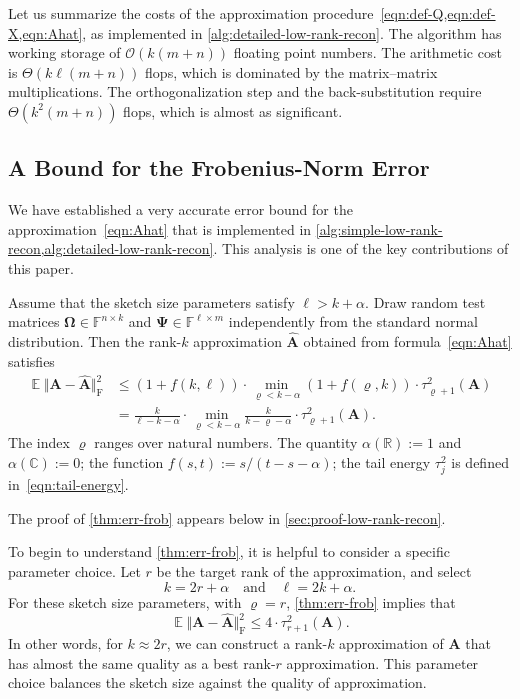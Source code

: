 \documentclass[final]{siamart1116}
\numberwithin{equation}{section}
\numberwithin{theorem}{section}
\numberwithin{figure}{section}
\newcommand{\R}{\mathbb{R}}
\newcommand{\C}{\mathbb{C}}
\newcommand{\F}{\mathbb{F}}
\newcommand{\mtx}[1]{\bm{#1}}
\newcommand{\norm}[1]{\Vert #1 \Vert}
\newcommand{\fnorm}[1]{\norm{#1}_{\mathrm{F}}}
\newcommand{\fnormsq}[1]{\fnorm{#1}^2}
\newcommand{\Expect}{\operatorname{\mathbb{E}}}
\begin{document}
Let us summarize the costs of the
approximation procedure~\cref{eqn:def-Q,eqn:def-X,eqn:Ahat},
as implemented in \cref{alg:detailed-low-rank-recon}.
The algorithm has working storage of $\mathcal{O}(k(m + n))$ floating point numbers.
The arithmetic cost is $\Theta(k\ell (m + n))$ flops, which is dominated
by the matrix--matrix multiplications. The orthogonalization step and the back-substitution require $\Theta(k^2 (m+n))$ flops, which is almost as significant.






\subsection{A Bound for the Frobenius-Norm Error} 
We have established a very accurate error bound for the
approximation~\cref{eqn:Ahat}
that is implemented in \cref{alg:simple-low-rank-recon,alg:detailed-low-rank-recon}.
This analysis is one of the key contributions of this paper.



\begin{theorem} \label{thm:err-frob}
Assume that the sketch size parameters satisfy $\ell > k + \alpha$.
Draw random test matrices $\mtx{\Omega} \in \F^{n \times k}$
and $\mtx{\Psi} \in \F^{\ell \times m}$
independently from the standard normal distribution.
Then the rank-$k$ approximation $\hat{\mtx{A}}$ obtained from formula~\cref{eqn:Ahat}
satisfies
\begin{equation} \label{eqn:err-frob}
\begin{aligned}
\Expect \fnormsq{ \mtx{A} - \hat{\mtx{A}} }
	&\leq (1 + f(k,\ell)) \cdot \min_{\varrho < k - \alpha} (1 + f(\varrho,k)) \cdot \tau_{\varrho+1}^2(\mtx{A}) \\
	&= \frac{k}{\ell - k - \alpha} \cdot \min_{\varrho < k - \alpha} \frac{k}{k - \varrho - \alpha}
	\cdot \tau_{\varrho+1}^2(\mtx{A}).
\end{aligned}
\end{equation}
The index $\varrho$ ranges over natural numbers.
The quantity $\alpha(\R) := 1$ and $\alpha(\C) := 0$;
the function $f(s, t) := s/(t-s-\alpha)$;
the tail energy $\tau_j^2$ is defined in~\cref{eqn:tail-energy}.
\end{theorem}

\noindent
The proof of \cref{thm:err-frob} appears below in \cref{sec:proof-low-rank-recon}.

To begin to understand \cref{thm:err-frob},
it is helpful to consider a specific parameter choice.
Let $r$ be the target rank of the approximation, and select
\begin{equation} \label{eqn:my-param-choice}
k = 2r + \alpha
\quad\text{and}\quad
\ell = 2k + \alpha.
\end{equation}
For these sketch size parameters, with $\varrho = r$, \cref{thm:err-frob} implies that
$$
\Expect \fnormsq{ \mtx{A} - \hat{\mtx{A}} }
	\leq 4 \cdot \tau_{r+1}^2(\mtx{A}).
$$
In other words, for $k \approx 2r$, we can construct a rank-$k$ approximation of $\mtx{A}$
that has almost the same quality as a best rank-$r$ approximation.
This parameter choice balances the sketch size against the quality of approximation.
\end{document}
